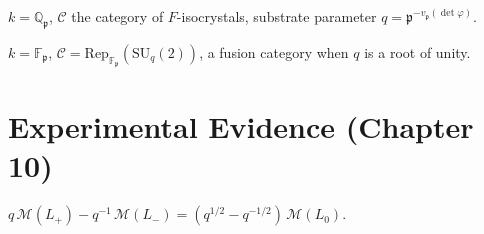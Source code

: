 \begin{definition}
  \label{def:p-adic-realisation}
  $k = \mathbb{Q}_\mathfrak{p}$, $\mathcal{C}$ the category of
  $F$-isocrystals, substrate parameter
  $q = \mathfrak{p}^{-v_\mathfrak{p}(\det\varphi)}$.
\end{definition}

\begin{definition}
  \label{def:finite-field-realisation}
  $k = \mathbb{F}_\mathfrak{p}$, $\mathcal{C} =
  \mathrm{Rep}_{\mathbb{F}_\mathfrak{p}}(\mathrm{SU}_q(2))$,
  a fusion category when $q$ is a root of unity.
\end{definition}


\chapter{Experimental Evidence (Chapter 10)}

\begin{definition}
  \label{def:skein-mass-relation}
  $q\,\mathcal{M}(L_+) - q^{-1}\,\mathcal{M}(L_-)
  = (q^{1/2} - q^{-1/2})\,\mathcal{M}(L_0)$.
\end{definition}
